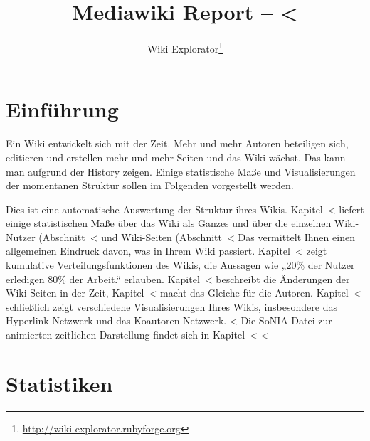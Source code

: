 \documentclass{scrartcl}
\title{Mediawiki Report -- <%
}
\author{Wiki Explorator\footnote{\protect\url{http://wiki-explorator.rubyforge.org}}}
\begin{document}
\maketitle

\section{Einführung} %
\label{sec:introduction}

Ein Wiki entwickelt sich mit der Zeit. Mehr und mehr Autoren beteiligen sich, editieren und erstellen mehr und mehr Seiten und das Wiki wächst. Das kann man aufgrund der History zeigen. Einige statistische Maße und Visualisierungen der momentanen Struktur sollen im Folgenden vorgestellt werden.

Dies ist eine automatische Auswertung der Struktur ihres Wikis. Kapitel~<%
liefert einige statistischen Maße über das Wiki als Ganzes und über die einzelnen Wiki-Nutzer (Abschnitt~<%
und Wiki-Seiten (Abschnitt~<%
Das vermittelt Ihnen einen allgemeinen Eindruck davon, was in Ihrem Wiki passiert. 
Kapitel~<%
zeigt kumulative Verteilungsfunktionen des Wikis, die Aussagen wie „20\% der Nutzer erledigen 80\% der Arbeit.“ erlauben. Kapitel~<%
beschreibt die Änderungen der Wiki-Seiten in der Zeit, Kapitel~<%
macht das Gleiche für die Autoren. Kapitel~<%
schließlich zeigt verschiedene  Visualisierungen Ihres Wikis, insbesondere das Hyperlink-Netzwerk und das Koautoren-Netzwerk.
<%
Die SoNIA-Datei zur animierten zeitlichen Darstellung findet sich in Kapitel~<%
<%

\section{Statistiken} %
\label{sec:statistics}
\end{document}
